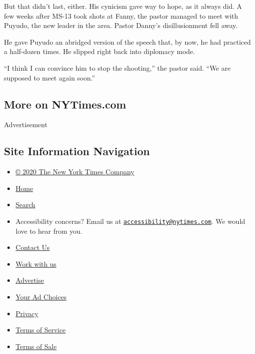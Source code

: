 But that didn't last, either. His cynicism gave way to hope, as it
always did. A few weeks after MS-13 took shots at Fanny, the pastor
managed to meet with Puyudo, the new leader in the area. Pastor Danny's
disillusionment fell away.

He gave Puyudo an abridged version of the speech that, by now, he had
practiced a half-dozen times. He slipped right back into diplomacy mode.

``I think I can convince him to stop the shooting,'' the pastor said.
``We are supposed to meet again soon.''

\hypertarget{more-on-nytimescom}{%
\subsection{More on NYTimes.com}\label{more-on-nytimescom}}

Advertisement

\hypertarget{site-information-navigation}{%
\subsection{Site Information
Navigation}\label{site-information-navigation}}

\begin{itemize}
\tightlist
\item
  \href{https://help.nytimes.com/hc/en-us/articles/115014792127-Copyright-notice}{©
  2020 The New York Times Company}
\item
  \href{https://www.nytimes.com}{Home}
\item
  \href{https://www.nytimes.com/search/}{Search}
\item
  Accessibility concerns? Email us at
  \href{mailto:accessibility@nytimes.com}{\nolinkurl{accessibility@nytimes.com}}.
  We would love to hear from you.
\item
  \href{https://help.nytimes.com/hc/en-us/articles/115015385887-Contact-Us}{Contact
  Us}
\item
  \href{https://www.nytco.com/careers/}{Work with us}
\item
  \href{https://nytmediakit.com/}{Advertise}
\item
  \href{https://help.nytimes.com/hc/en-us/articles/115014892108-Privacy-policy\#pp}{Your
  Ad Choices}
\item
  \href{https://help.nytimes.com/hc/en-us/articles/115014892108-Privacy-policy}{Privacy}
\item
  \href{https://help.nytimes.com/hc/en-us/articles/115014893428-Terms-of-service}{Terms
  of Service}
\item
  \href{https://help.nytimes.com/hc/en-us/articles/115014893968-Terms-of-sale}{Terms
  of Sale}
\end{itemize}

